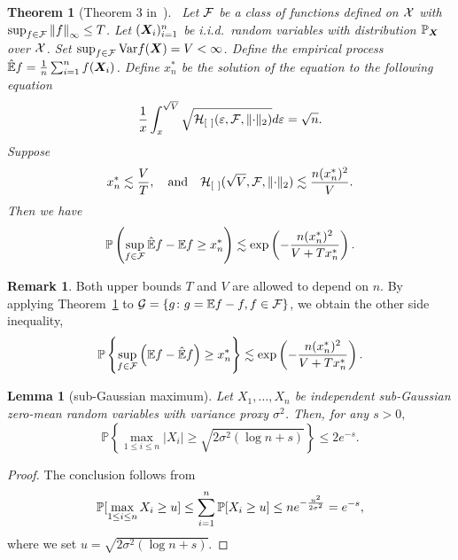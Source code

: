 \documentclass[11pt]{article}
\theoremstyle{plain}
\newtheorem{thm}{Theorem}[subsection]
\newtheorem{lem}{Lemma}
\theoremstyle{definition}
\newtheorem{rmk}{Remark}
\begin{document}
\begin{thm}[Theorem 3 in~\cite{shen1994convergence}]~\label{thm:refer}Let $\mathcal{F}$ be a class of functions defined on $\mathcal{X}$ with $\sup_{f\in\mathcal{F}}\left\lVert f\right\rVert_{\infty}\leq T$. Let $(\bm X_i)_{i=1}^n$ be i.i.d.\ random variables with distribution $\mathbb{P}_{\bm X}$ over $\mathcal{X}$. Set $\sup_{f\in\mathcal{F}}\textup{Var}f(\bm X)=V<\infty$. 
Define the empirical process $\mathbb{\hat E}f={1\over n}\sum_{i=1}^n f(\bm X_i)$. 
Define $x_n^*$ be the solution of the equation to the following equation
\[
{1\over x}\int_x^{\sqrt{V}}\sqrt{\mathcal{H}_{[\ ]}(\varepsilon,\mathcal{F},\lVert\cdot\rVert_2)}d\varepsilon =\sqrt{n}.
\]
Suppose
\[
x_n^*\lesssim {V\over T},\quad \text{and}\quad \mathcal{H}_{[\ ]}(\sqrt{V},\mathcal{F},\lVert\cdot\rVert_2)\lesssim {n(x_n^*)^2 \over V}.
\]
Then we have
\begin{equation}\label{eq:oneside}
\mathbb{P}\left(\sup_{f\in\tF}\mathbb{\hat E}f -\mathbb{E}f\geq x^*_n\right)\lesssim  \exp\left(-{n (x^*_n)^2\over V+Tx^*_n}\right). %
\end{equation}
\end{thm}
\begin{rmk}
Both upper bounds $T$ and $V$ are allowed to depend on $n$. By applying Theorem~\ref{thm:refer} to $\mathcal{G}=\{g\colon g= \mathbb{E}f-f, f\in \mathcal{F}\}$, we obtain the other side inequality,
\[
\mathbb{P}\left\{\sup_{f\in\mathcal{F}}\left(\mathbb{E}f-\mathbb{\hat E}f \right)\geq x_n^*\right\}\lesssim \exp\left(-{n (x^*_n)^2\over V+Tx^*_n}\right).
\]
\end{rmk}

\begin{lem}[sub-Gaussian maximum]\label{lem:subg}
Let $X_1,\ldots,X_n$ be independent sub-Gaussian zero-mean random variables with variance proxy $\sigma^2$. Then, for any $s>0,$
\[\mathbb{P}\left\{\max_{1\leq i\leq n}|X_i|\geq\sqrt{2\sigma^2(\log n +s)}\right\}\leq2 e^{-s}.\]
\end{lem}
\begin{proof}
The conclusion follows from
\begin{align}
\mathbb{P}[\max_{1\leq i\leq n}X_i\geq u] \leq \sum_{i=1}^n\mathbb{P}[X_i\geq u]\leq n e^{-{u^2\over 2\sigma^2}} = e^{-s},
\end{align}
where we set $u = \sqrt{2\sigma^2(\log n+s)}.$
\end{proof}



     
\end{document}
